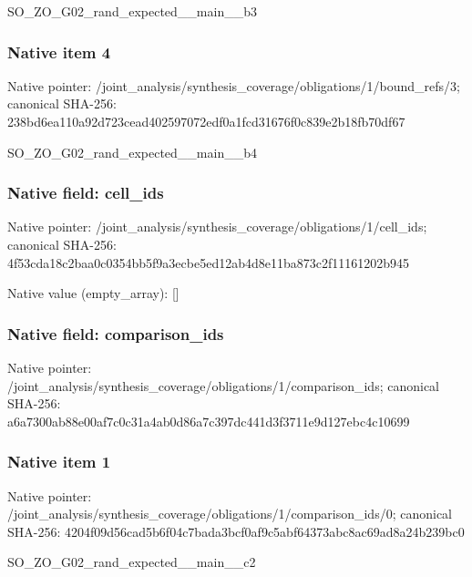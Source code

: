 \documentclass[10pt,a4paper]{article}
\begin{document}
\begingroup\raggedright\sloppy SO\_\allowbreak{}ZO\_\allowbreak{}G02\_\allowbreak{}rand\_\allowbreak{}expected\_\allowbreak{}\_\allowbreak{}main\_\allowbreak{}\_\allowbreak{}b3\par\endgroup

\subsubsection{Native item 4}
Native pointer: /joint\_\allowbreak{}analysis/synthesis\_\allowbreak{}coverage/obligations/1/bound\_\allowbreak{}refs/3; canonical SHA-256: 238bd6ea110a92d723cead402597072edf0a1fcd31676f0c839e2b18fb70df67

\begingroup\raggedright\sloppy SO\_\allowbreak{}ZO\_\allowbreak{}G02\_\allowbreak{}rand\_\allowbreak{}expected\_\allowbreak{}\_\allowbreak{}main\_\allowbreak{}\_\allowbreak{}b4\par\endgroup

\subsubsection{Native field: cell\_\allowbreak{}ids}
Native pointer: /joint\_\allowbreak{}analysis/synthesis\_\allowbreak{}coverage/obligations/1/cell\_\allowbreak{}ids; canonical SHA-256: 4f53cda18c2baa0c0354bb5f9a3ecbe5ed12ab4d8e11ba873c2f11161202b945

Native value (empty\_\allowbreak{}array): []

\subsubsection{Native field: comparison\_\allowbreak{}ids}
Native pointer: /joint\_\allowbreak{}analysis/synthesis\_\allowbreak{}coverage/obligations/1/comparison\_\allowbreak{}ids; canonical SHA-256: a6a7300ab88e00af7c0c31a4ab0d86a7c397dc441d3f3711e9d127ebc4c10699

\subsubsection{Native item 1}
Native pointer: /joint\_\allowbreak{}analysis/synthesis\_\allowbreak{}coverage/obligations/1/comparison\_\allowbreak{}ids/0; canonical SHA-256: 4204f09d56cad5b6f04c7bada3bcf0af9c5abf64373abc8ac69ad8a24b239bc0

\begingroup\raggedright\sloppy SO\_\allowbreak{}ZO\_\allowbreak{}G02\_\allowbreak{}rand\_\allowbreak{}expected\_\allowbreak{}\_\allowbreak{}main\_\allowbreak{}\_\allowbreak{}c2\par\endgroup
\end{document}
